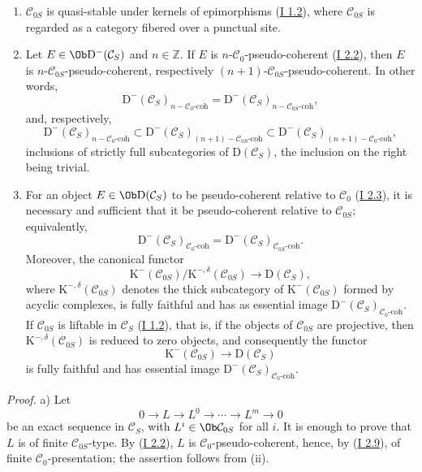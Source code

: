 \begin{enumerate}[label=\alph*)]
\item $\mathcal C_{0S}$ is quasi-stable under kernels of epimorphisms (\hyperlink{sga6.e01.sec.1.2}{I 1.2}), where $\mathcal C_{0S}$ is regarded as a category fibered over a punctual site.
\item Let $E\in\Ob \mathrm D^{-}(\mathcal C_S)$ and $n\in\mathbb Z$. If $E$ is $n$-$\mathcal C_0$-pseudo-coherent (\hyperlink{sga6.e01.prop.2-2}{I 2.2}), then $E$ is $n$-$\mathcal C_{0S}$-pseudo-coherent, respectively $(n+1)$-$\mathcal C_{0S}$-pseudo-coherent. In other words,
\[
\mathrm D^{-}(\mathcal C_S)_{n-\mathcal C_0\text{-coh}}
=
\mathrm D^{-}(\mathcal C_S)_{n-\mathcal C_{0S}\text{-coh}},
\]
and, respectively,
\[
\mathrm D^{-}(\mathcal C_S)_{n-\mathcal C_0\text{-coh}}
\subset
\mathrm D^{-}(\mathcal C_S)_{(n+1)-\mathcal C_{0S}\text{-coh}}
\subset
\mathrm D^{-}(\mathcal C_S)_{(n+1)-\mathcal C_0\text{-coh}},
\]
inclusions of strictly full subcategories of $\mathrm D(\mathcal C_S)$, the inclusion on the right being trivial.
\item For an object $E\in\Ob\mathrm D(\mathcal C_S)$ to be pseudo-coherent relative to $\mathcal C_0$ (\hyperlink{sga6.e01.def.2-3}{I 2.3}), it is necessary and sufficient that it be pseudo-coherent relative to $\mathcal C_{0S}$; equivalently,
\[
\mathrm D^{-}(\mathcal C_S)_{\mathcal C_0\text{-coh}}
=
\mathrm D^{-}(\mathcal C_S)_{\mathcal C_{0S}\text{-coh}}.
\]
Moreover, the canonical functor
\[
\mathrm K^{-}(\mathcal C_{0S})/\mathrm K^{-,\delta}(\mathcal C_{0S})
\longrightarrow \mathrm D(\mathcal C_S),
\]
where $\mathrm K^{-,\delta}(\mathcal C_{0S})$ denotes the thick subcategory of $\mathrm K^{-}(\mathcal C_{0S})$ formed by acyclic complexes, is fully faithful and has as essential image $\mathrm D^{-}(\mathcal C_S)_{\mathcal C_0\text{-coh}}$. If $\mathcal C_{0S}$ is liftable in $\mathcal C_S$ (\hyperlink{sga6.e01.sec.1.2}{I 1.2}), that is, if the objects of $\mathcal C_{0S}$ are projective, then $\mathrm K^{-,\delta}(\mathcal C_{0S})$ is reduced to zero objects, and consequently the functor
\[
\mathrm K^{-}(\mathcal C_{0S})\longrightarrow \mathrm D(\mathcal C_S)
\]
is fully faithful and has essential image $\mathrm D^{-}(\mathcal C_S)_{\mathcal C_0\text{-coh}}$.
\end{enumerate}

\emph{Proof.} a) Let
\[
0\longrightarrow L\longrightarrow L^0\longrightarrow\cdots\longrightarrow L^m\longrightarrow0
\]
be an exact sequence in $\mathcal C_S$, with $L^i\in\Ob\mathcal C_{0S}$ for all $i$. It is enough to prove that $L$ is of finite $\mathcal C_{0S}$-type. By (\hyperlink{sga6.e01.prop.2-2}{I 2.2}), $L$ is $\mathcal C_0$-pseudo-coherent, hence, by (\hyperlink{sga6.e01.prop.2-9}{I 2.9}), of finite $\mathcal C_0$-presentation; the assertion follows from (ii).

